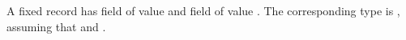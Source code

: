\begin{isabellebody}
\begin{isamarkuptext}
  A fixed record  has field  of value
   and field  of value .  The corresponding
  type is , assuming that 
  and .


\end{isamarkuptext}
\end{isabellebody}
